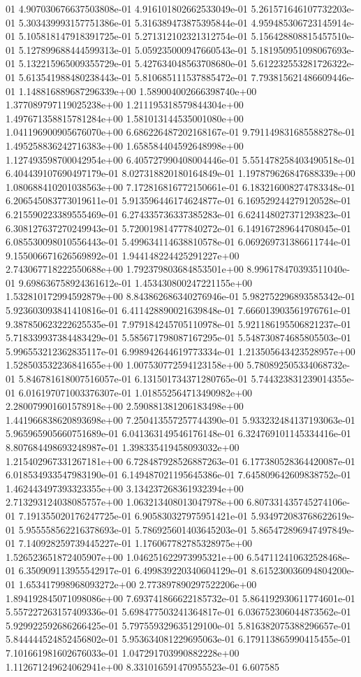 01	4.907030676637503808e-01	4.916101802662533049e-01	5.261571646107732203e-01	5.303439993157751386e-01	5.316389473875395844e-01	4.959485306723145914e-01	5.105818147918391725e-01	5.271312102321312754e-01	5.156428808815457510e-01	5.127899688444599313e-01	5.059235000947660543e-01	5.181950951098067693e-01	5.132215965009355729e-01	5.427634048563708680e-01	5.612232553281726322e-01	5.613541988480238443e-01	5.810685111537885472e-01	7.793815621486609446e-01	1.148816889687296339e+00	1.589004002666398740e+00	1.377089797119025238e+00	1.211195318579844304e+00	1.497671358815781284e+00	1.581013144535001080e+00	1.041196900905676070e+00	6.686226487202168167e-01	9.791149831685588278e-01	1.495258836242716383e+00	1.658584404592648998e+00	1.127493598700042954e+00	6.405727990408004446e-01	5.551478258403490518e-01	6.404439107690497179e-01	8.027318820180164849e-01	1.197879626847688339e+00	1.080688410201038563e+00	7.172816816772150661e-01	6.183216008274783348e-01	6.206545083773019611e-01	5.913596446174624877e-01	6.169529244279120528e-01	6.215590223389555469e-01	6.274335736337385283e-01	6.624148027371293823e-01	6.308127637270249943e-01	5.720019814777840272e-01	6.149167289644708045e-01	6.085530098010556443e-01	5.499634114638810578e-01	6.069269731386611744e-01	9.155006671626569892e-01	1.944148224425291227e+00	2.743067718222550688e+00	1.792379803684853501e+00	8.996178470393511040e-01	9.698636758924361612e-01	1.453430800247221155e+00	1.532810172994592879e+00	8.843862686340276946e-01	5.982752296893585342e-01	5.923603093841410816e-01	6.411428890021639848e-01	7.666013903561976761e-01	9.387850623222625535e-01	7.979184245705110978e-01	5.921186195506821237e-01	5.718339937384483429e-01	5.585671798087167295e-01	5.548730874685805503e-01	5.996553212362835117e-01	6.998942644619773334e-01	1.213505643423528957e+00	1.528503532236841655e+00	1.007530772594123158e+00	5.780892505334068732e-01	5.846781618007516057e-01	6.131501734371280765e-01	5.744323831239014355e-01	6.016197071003376307e-01	1.018552564713490982e+00	2.280079901601578918e+00	2.590881381206183498e+00	1.441966838620893698e+00	7.250413557257744390e-01	5.933232484137193063e-01	5.965965905660751689e-01	6.041363149546176148e-01	6.324769101145334416e-01	8.807684498693248987e-01	1.398335419458093032e+00	1.215402967331267181e+00	6.728487928526887263e-01	6.177380528364420087e-01	6.018534933547983190e-01	6.149487021195645386e-01	7.645809642609838752e-01	1.462443497393323355e+00	3.134237268361932394e+00	2.713293124038085757e+00	1.063213408013047978e+00	6.807331435745274106e-01	7.191355020176247725e-01	6.905830327975951421e-01	5.934972083768622619e-01	5.955558562216378693e-01	5.786925601403645203e-01	5.865472896947497849e-01	7.140928259739445227e-01	1.176067782785328975e+00	1.526523651872405907e+00	1.046251622973995321e+00	6.547112410632528468e-01	6.350909113955542917e-01	6.499839220340604129e-01	8.615230036094804200e-01	1.653417998968093272e+00	2.773897890297522206e+00	1.894192845071098086e+00	7.693741866622185732e-01	5.864192930611774601e-01	5.557227263157409336e-01	5.698477503241364817e-01	6.036752306044873562e-01	5.929922592686266425e-01	5.797559329635129100e-01	5.816382075388296657e-01	5.844444524852456802e-01	5.953634081229695063e-01	6.179113865990415455e-01	7.101661981602676033e-01	1.047291703990882228e+00	1.112671249624062941e+00	8.331016591470955523e-01	6.607585